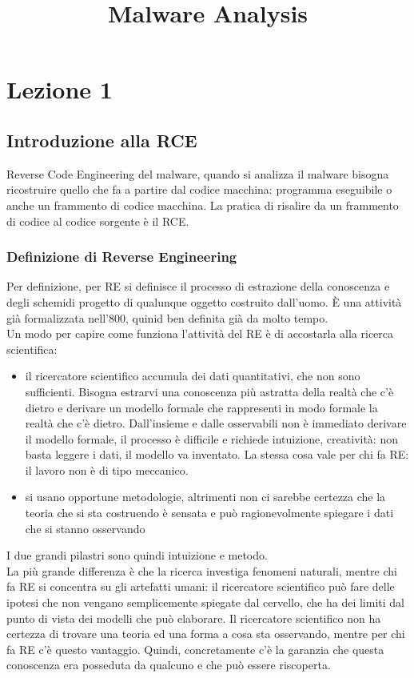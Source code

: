 \documentclass[12pt, oneside]{extbook}
\title{Malware Analysis}
\begin{document}
\maketitle
\tableofcontents
\chapter{Lezione 1}
\section{Introduzione alla RCE}
Reverse Code Engineering del malware, quando si analizza il malware bisogna ricostruire quello che fa a partire dal codice macchina: programma eseguibile o anche un frammento di codice macchina. La pratica di risalire da un frammento di codice al codice sorgente è il RCE.
\subsection{Definizione di Reverse Engineering}
Per definizione, per RE si definisce il processo di estrazione della conoscenza e degli schemidi progetto di qualunque oggetto costruito dall'uomo. È una attività già formalizzata nell'800, quinid ben definita già da molto tempo.\\ Un modo per capire come funziona l'attività del RE è di accostarla alla ricerca scientifica:
\begin{itemize}
\item il ricercatore scientifico accumula dei dati quantitativi, che non sono sufficienti. Bisogna estrarvi una conoscenza più astratta della realtà che c'è dietro e derivare un modello formale che rappresenti in modo formale la realtà che c'è dietro. Dall'insieme e dalle osservabili non è immediato derivare il modello formale, il processo è difficile e richiede intuizione, creatività: non basta leggere i dati, il modello va inventato. La stessa cosa vale per chi fa RE: il lavoro non è di tipo meccanico.
\item si usano opportune metodologie, altrimenti non ci sarebbe certezza che la teoria che si sta costruendo è sensata e può ragionevolmente spiegare i dati che si stanno osservando
\end{itemize}
I due grandi pilastri sono 	quindi intuizione e metodo.\\ La più grande differenza è che la ricerca investiga fenomeni naturali, mentre chi fa RE si concentra su gli artefatti umani: il ricercatore scientifico può fare delle ipotesi che non vengano semplicemente spiegate dal cervello, che ha dei limiti dal punto di vista dei modelli che può elaborare. Il ricercatore scientifico non ha certezza di trovare una teoria ed una forma a cosa sta osservando, mentre per chi fa RE c'è questo vantaggio. Quindi, concretamente c'è la garanzia che questa conoscenza era posseduta da qualcuno e che può essere riscoperta. 
\end{document}
